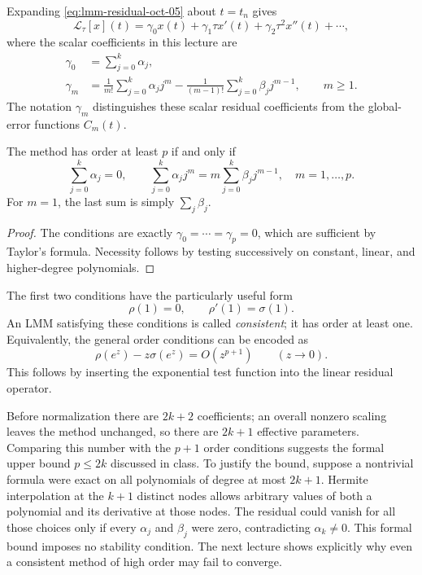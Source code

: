 Expanding \eqref{eq:lmm-residual-oct-05} about \(t=t_n\) gives
\[
 \mathcal L_\tau[x](t)
   =\gamma_0x(t)+\gamma_1\tau x'(t)+\gamma_2\tau^2x''(t)+\cdots,
\]
where the scalar coefficients in this lecture are
\begin{align*}
 \gamma_0&=\sum_{j=0}^k\alpha_j,\\
 \gamma_m&=\frac1{m!}\sum_{j=0}^k\alpha_jj^m
       -\frac1{(m-1)!}\sum_{j=0}^k\beta_jj^{m-1},
       \qquad m\geq1.
\end{align*}
The notation \(\gamma_m\) distinguishes these scalar residual
coefficients from the global-error functions \(C_m(t)\).

\begin{lemma}
 The method has order at least \(p\) if and only if
 \begin{equation}\label{eq:lmm-order-conditions-oct-05}
  \boxed{\sum_{j=0}^k\alpha_j=0,\qquad
  \sum_{j=0}^k\alpha_jj^m
    =m\sum_{j=0}^k\beta_jj^{m-1},\quad m=1,\ldots,p.}
 \end{equation}
 For \(m=1\), the last sum is simply \(\sum_j\beta_j\).
\end{lemma}

\begin{proof}
 The conditions are exactly \(\gamma_0=\cdots=\gamma_p=0\), which are
 sufficient by Taylor's formula. Necessity follows by testing
 successively on constant, linear, and higher-degree polynomials.
\end{proof}

The first two conditions have the particularly useful form
\begin{equation}\label{eq:lmm-consistency-oct-05}
 \boxed{\rho(1)=0,\qquad \rho'(1)=\sigma(1).}
\end{equation}
An LMM satisfying these conditions is called \emph{consistent};
it has order at least one. Equivalently, the general order conditions
can be encoded as
\[
 \rho(e^z)-z\sigma(e^z)=O(z^{p+1})\qquad(z\to0).
\]
This follows by inserting the exponential test function into the
linear residual operator.

Before normalization there are \(2k+2\) coefficients; an overall
nonzero scaling leaves the method unchanged, so there are
\(2k+1\) effective parameters. Comparing this number with the
\(p+1\) order conditions suggests the formal upper bound \(p\leq2k\)
discussed in class. To justify the bound, suppose a nontrivial formula
were exact on all polynomials of degree at most \(2k+1\).
Hermite interpolation at the \(k+1\) distinct nodes allows arbitrary
values of both a polynomial and its derivative at those nodes.
The residual could vanish for all those choices only if every
\(\alpha_j\) and \(\beta_j\) were zero, contradicting
\(\alpha_k\neq0\). This formal bound imposes no stability condition.
The next lecture shows explicitly why even a consistent method of
high order may fail to converge.
